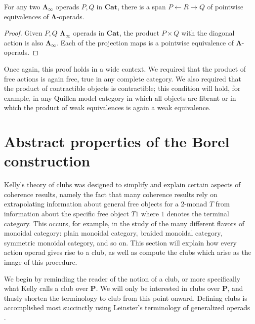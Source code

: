 \documentclass{amsbook} %
\newcommand{\mb}{\mathbf}
\numberwithin{section}{chapter}
\begin{document}
\begin{prop}
For any two $\mb{\Lambda}_{\infty}$ operads $P,Q$ in $\mb{Cat}$, there is a span $P \leftarrow R \rightarrow Q$  of pointwise equivalences of $\mb{\Lambda}$-operads.
\end{prop}
\begin{proof}
Given $P,Q$ $\mb{\Lambda}_{\infty}$ operads in $\mb{Cat}$, the product $P \times Q$ with the diagonal action is also $\mb{\Lambda}_{\infty}$.  Each of the projection maps is a pointwise equivalence of $\mb{\Lambda}$-operads.
\end{proof}
\begin{rem}
Once again, this proof holds in a wide context.  We required that the product of free actions is again free, true in any complete category.  We also required that the product of contractible objects is contractible; this condition will hold, for example, in any Quillen model category in which all objects are fibrant or in which the product of weak equivalences is again a weak equivalence.
\end{rem}


\section{Abstract properties of the Borel construction}

Kelly's theory of clubs \cite{kelly_club1, kelly_club0, kelly_club2} was designed to simplify and explain certain aspects of coherence results, namely the fact that many coherence results rely on extrapolating information about general free objects for a 2-monad $T$ from information about the specific free object $T1$ where $1$ denotes the terminal category.  This occurs, for example, in the study of the many different flavors of monoidal category:  plain monoidal category, braided monoidal category, symmetric monoidal category, and so on.  This section will explain how every action operad gives rise to a club, as well as compute the clubs which arise as the image of this procedure.

We begin by reminding the reader of the notion of a club, or more specifically what Kelly \cite{kelly_club1,kelly_club2} calls a club over $\mb{P}$.  We will only be interested in clubs over $\mb{P}$, and thusly shorten the terminology to club from this point onward.  Defining clubs is accomplished most succinctly using Leinster's terminology of generalized operads \cite{leinster}.
\end{document}
